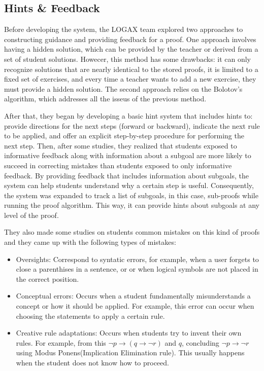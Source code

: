 \subsection{Hints \& Feedback}
Before developing the system, the LOGAX team explored two approaches to constructing guidance and providing feedback for a proof. One approach involves having a hidden solution, which can be provided by the teacher or derived from a set of student solutions. Howecer, this method has some drawbacks: it can only recognize solutions that are nearly identical to the stored proofs, it is limited to a fixed set of exercises, and every time a teacher wants to add a new exercise, they must provide a hidden solution. The second approach relies on the Bolotov's algorithm, which addresses all the isseus of the previous method.

After that, they began by developing a basic hint system that includes hints to: provide directions for the next steps (forward or backward), indicate the next rule to be applied, and offer an explicit step-by-step procedure for performing the next step. Then, after some studies, they realized that students exposed to informative feedback along with information about a subgoal are more likely to succeed in correcting mistakes than students exposed to only informative feedback. 
By providing feedback that includes information about subgoals, the system can help students understand why a certain step is useful. Consequently, the system was expanded to track a list of subgoals, in this case, sub-proofs while running the proof algorithm. This way, it can provide hints about subgoals at any level of the proof.

They also made some studies on students common mistakes on this kind of proofs and they came up with the following types of mistakes:
\begin{itemize}
    \item Oversights: Correspond to syntatic errors, for example, when a user forgets to close a parenthises in a sentence, or or when logical symbols are not placed in the correct position.
    \item Conceptual errors: Occurs when a student fundamentally misunderstands a concept or how it should be applied. For example, this error can occur when choosing the statements to apply a certain rule.
    \item Creative rule adaptations: Occurs when students try to invent their own rules. For example, from this \( \neg p \to (q \to \neg r) \) and \( q \), concluding \( \neg p \to \neg r \) using Modus Ponens(Implication Elimination rule). This usually happens when the student does not know how to proceed.
\end{itemize}

